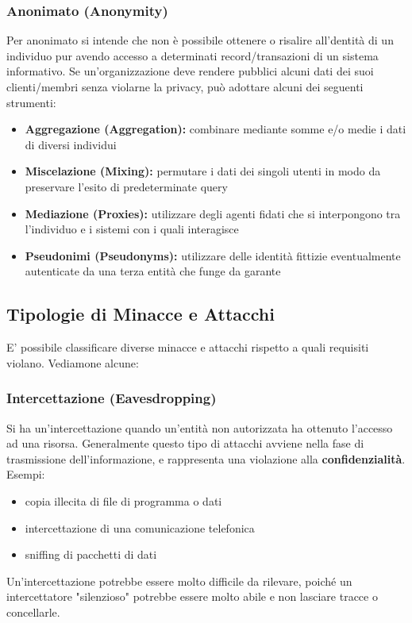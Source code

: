 \subsubsection{Anonimato (Anonymity)}
Per anonimato si intende che non è possibile ottenere o risalire all’dentità di un individuo pur avendo accesso a determinati record/transazioni di un sistema informativo. Se un'organizzazione deve rendere pubblici alcuni dati dei suoi clienti/membri senza violarne la privacy, può adottare alcuni dei seguenti strumenti:
\begin{itemize} 
  \item \textbf{Aggregazione (Aggregation):} combinare mediante somme e/o medie i dati di diversi individui
  \item \textbf{Miscelazione (Mixing):} permutare i dati dei singoli utenti in modo da preservare l’esito di predeterminate query
  \item \textbf{Mediazione (Proxies):} utilizzare degli agenti fidati che si interpongono tra l’individuo e i sistemi con i quali interagisce
  \item \textbf{Pseudonimi (Pseudonyms):} utilizzare delle identità fittizie eventualmente autenticate da una terza entità che funge da garante 
\end{itemize}

\subsection{Tipologie di Minacce e Attacchi}
E' possibile classificare diverse minacce e attacchi rispetto a quali requisiti violano. Vediamone alcune:

\subsubsection{Intercettazione (Eavesdropping)}
Si ha un'intercettazione quando un'entità non autorizzata ha ottenuto l’accesso ad una risorsa. Generalmente questo tipo di attacchi avviene nella fase di trasmissione dell'informazione, e rappresenta una violazione alla \textbf{confidenzialità}. Esempi:
\begin{itemize} 
  \item copia illecita di file di programma o dati
  \item intercettazione di una comunicazione telefonica
  \item sniffing di pacchetti di dati
\end{itemize}
Un'intercettazione potrebbe essere molto difficile da rilevare, poiché un intercettatore "silenzioso" potrebbe essere molto abile e non lasciare tracce o concellarle. 

